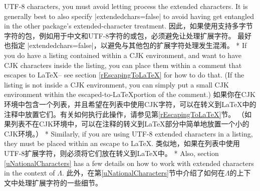 \begin{paracol}{2}
UTF-8 characters, you must avoid letting 
process the extended characters.  It is generally best to also specify
|extendedchars=false| to avoid having  get entangled
in the other package's extended-character treatment.
\switchcolumn
因此，如果使用支持多字节字符的包，例如用于中文和UTF-8字符的或包，必须避免让处理扩展字符。
最好也指定 |extendedchars=false|，以避免与其他包的扩展字符处理发生混淆。
\switchcolumn[0]*%
If you do have a listing contained within a CJK environment, and want to have
CJK characters inside the listing, you can place them within a comment that
escapes to \LaTeX -- see section \ref{rEscapingToLaTeX} for how to do that.
(If the listing is not inside a CJK environment, you can simply put a small
CJK environment within the escaped-to-\LaTeX portion of the comment.)
\switchcolumn
如果你在CJK环境中包含一个列表，并且希望在列表中使用CJK字符，可以在转义到\LaTeX 中的注释中放置它们。有关如何执行此操作，请参见第\ref{rEscapingToLaTeX}节。
（如果列表不在CJK环境中，可以在注释的转义到\LaTeX 部分中简单地放置一个小的CJK环境。）
\switchcolumn[0]*%
Similarly, if you are using UTF-8 extended characters in a listing, they must
be placed within an escape to \LaTeX.
\switchcolumn
类似地，如果在列表中使用UTF-8扩展字符，则必须将它们放在转义到\LaTeX 中。
\switchcolumn[0]*%
Also, section \ref{uNationalCharacters} has a few details on how to work with
extended characters in the context of $\Lambda$.
\switchcolumn
此外，在第\ref{uNationalCharacters}节中介绍了如何在$\Lambda$的上下文中处理扩展字符的一些细节。
\end{paracol}